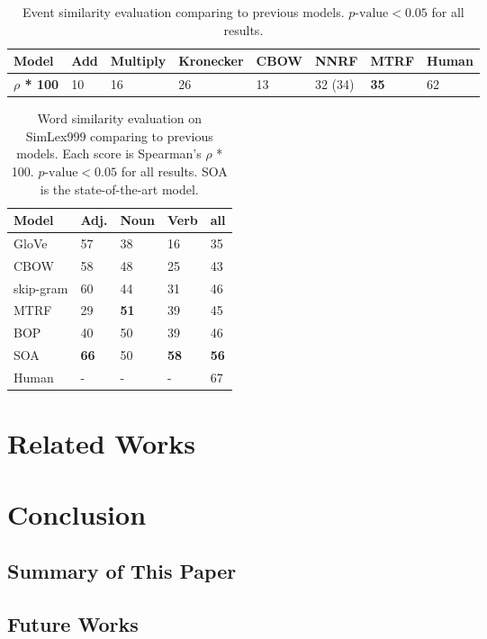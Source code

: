 \documentclass[a4paper]{article}
\begin{document}
\begin{table}[t]
\centering
\begin{tabular}{l||lll|ll|l|l}
\textbf{Model}          &   Add & Multiply & Kronecker & CBOW &   NNRF    &   MTRF  &   Human   \\ \hline
\textbf{$\rho$ * 100}   &   10  &   16  &   26          &   13      &   32 (34) &   \textbf{35} &   62      \\
\end{tabular}
\caption{\label{tab:GS_mtrf} Event similarity evaluation comparing to previous models. $p\text{-value} < 0.05$ for all results. }
\end{table}
% 
% 


\begin{table}[t]
\centering
\begin{tabular}{l||l|l|l|l}
\textbf{Model}  &   Adj.&   Noun    &   Verb    &   all \\ \hline
GloVe       &       57  &   38      &   16      &   35  \\
CBOW        &       58  &   48      &   25      &   43  \\
skip-gram   &       60  &   44      &   31      &   46  \\
MTRF        &       29  & \textbf{51} & 39      &   45  \\
BOP         &       40  &   50      &   39      &   46  \\ \hline
SOA         & \textbf{66} & 50  & \textbf{58} & \textbf{56} \\
Human       &       -   &   -       &   -       &   67  \\
\end{tabular}
\caption{\label{tab:GS_mtrf} Word similarity evaluation on SimLex999 comparing to previous models. Each score is Spearman's $\rho$ * 100. $p\text{-value} < 0.05$ for all results. SOA is the state-of-the-art model. }
\end{table}


\section{Related Works}



\section{Conclusion} 
\subsection{Summary of This Paper} 



\subsection{Future Works}



\newpage




\end{document}
